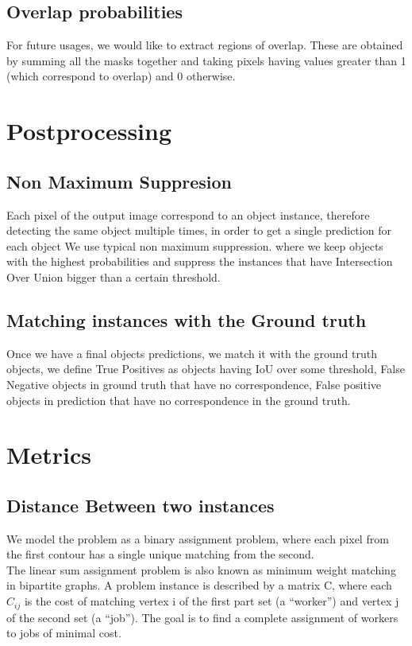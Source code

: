 \documentclass[main.tex]{subfiles}
\begin{document}
\subsection{Overlap probabilities}
For future usages, we would like to extract regions of overlap. These are obtained by summing all the masks together and taking pixels having values greater than 1 (which correspond to overlap) and 0 otherwise.




\section{Postprocessing}
\subsection{Non Maximum Suppresion}
Each pixel of the output image correspond to an object instance, therefore detecting the same object multiple times, in order to get a single prediction for each object We use typical non maximum suppression. where we keep objects with the highest probabilities and suppress the instances that have Intersection Over Union bigger than a certain threshold.

\subsection{Matching instances with the Ground truth}
Once we have a final objects predictions, we match it with the ground truth objects, we define True Positives as objects having IoU over some threshold, False Negative objects in ground truth that have no correspondence, False positive objects in prediction that have no correspondence in the ground truth.
\section{Metrics}
\subsection{Distance Between two instances}
We model the problem as a binary assignment problem, where each pixel from the first contour has a single unique matching from the second.\\

The linear sum assignment problem is also known as minimum weight matching in bipartite graphs. A problem instance is described by a matrix C, where each $C_{ij}$ is the cost of matching vertex i of the first part set (a “worker”) and vertex j of the second set (a “job”). The goal is to find a complete assignment of workers to jobs of minimal cost.\\
\end{document}
